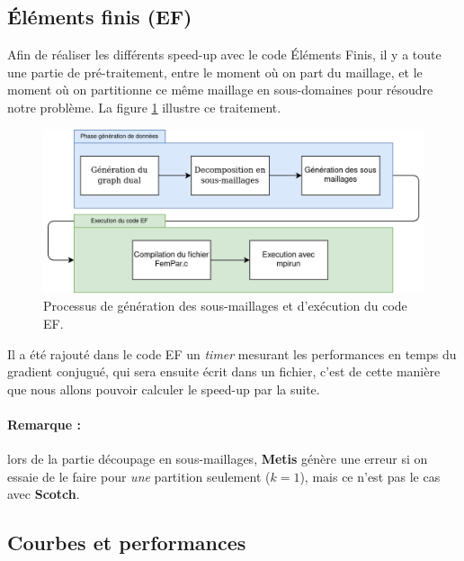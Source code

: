 \documentclass[a4paper,11pt]{article}
\begin{document}
\subsection{Éléments finis (EF)}
\noindent Afin de réaliser les différents speed-up avec le code Éléments Finis, il y a toute une partie de pré-traitement, entre le moment où on part du maillage, et le moment où on partitionne ce même maillage en sous-domaines pour résoudre notre problème. La figure \ref{fig:processus_generation} illustre ce traitement.

\begin{figure}[H]
	\centering
	\includegraphics[width=0.70\linewidth]{figures/processus_experience_simulation.png}
	\caption{Processus de génération des sous-maillages et d'exécution du code EF.}
	\label{fig:processus_generation}
\end{figure}

\noindent Il a été rajouté dans le code EF un \textit{timer} mesurant les performances en temps du gradient conjugué, qui sera ensuite écrit dans un fichier, c'est de cette manière que nous allons pouvoir calculer le speed-up par la suite. 

\paragraph{Remarque :} lors de la partie découpage en sous-maillages, \textbf{Metis} génère une erreur si on essaie de le faire pour \textit{une} partition seulement ($k=1$), mais ce n'est pas le cas avec \textbf{Scotch}.


\subsection{Courbes et performances}
\end{document}
